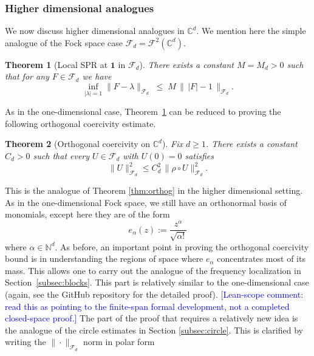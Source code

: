 \documentclass[11pt]{amsart}
\newtheorem{theorem}{Theorem}[section]
\theoremstyle{remark}
\newcommand{\C}{\mathbb{C}}
\newcommand{\abs}[1]{\lvert #1 \rvert}
\newcommand{\norm}[1]{\lVert #1 \rVert}
\newcommand{\dd}{\mathrm{d}}
\newcommand{\ee}{\mathrm{e}}
\newcommand{\rhoFn}{\rho}
\newcommand{\Fd}{\mathcal{F}_d}
\begin{document}
\subsubsection{Higher dimensional analogues} We now discuss higher dimensional analogues in $\mathbb{C}^d$. We mention here the simple analogue of the Fock space case $\Fd = \mathcal{F}^2(\C^d)$. 


\begin{theorem}[Local SPR at $\mathbf{1}$ in $\mathcal{F}_d$]\label{mainhigherd:local}
There exists a constant $M=M_d> 0$ such
that for any $F\in \mathcal{F}_d$ we have
\[
\inf_{|\lambda|=1}\lVert F - \lambda \rVert_{\mathcal{F}_d}
\;\le\;
M\,
\bigl\|\, \lvert F \rvert - 1 \,\bigr\|_{\mathcal{F}_d}.
\]
\end{theorem}
As in the one-dimensional case, Theorem~\ref{mainhigherd:local} can be reduced to proving the following orthogonal coercivity estimate.
\begin{theorem}[Orthogonal coercivity on $\C^d$]\label{thm:orthogd}
Fix $d \ge 1$.  There exists a constant $C_d > 0$ such that every
$U \in \Fd$ with $U(0) = 0$ satisfies
\[
\norm{U}_{\Fd}^2
\le
C_d^2\, \norm{\rhoFn \circ U}_{\Fd}^2.
\]
\end{theorem}
This is the analogue of Theorem \ref{thm:orthog} in the higher dimensional setting. As in the one-dimensional Fock space, we still have an orthonormal basis of monomials, except here they are of the form
\[
e_\alpha(z) := \frac{z^\alpha}{\sqrt{\alpha!}}
\]
where $\alpha\in\mathbb{N}^d$. As before, an important point in proving the orthogonal coercivity bound is in understanding the regions of space where $e_{\alpha}$ concentrates most of its mass. This allows one to carry out the analogue of the frequency localization in Section~\ref{subsec:blocks}. This part is relatively similar to the one-dimensional case (again, see the GitHub repository for the detailed proof). \textcolor{blue}{[Lean-scope comment: read this as pointing to the finite-span formal development, not a completed closed-space proof.] } The part of the proof that requires a relatively new idea is the analogue of the circle estimates in Section \ref{subsec:circle}. This is clarified by writing the $\|\cdot\|_{\mathcal{F}_d}$ norm in polar form
\end{document}
